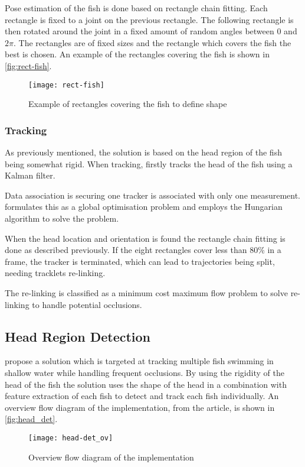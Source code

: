 Pose estimation of the fish is done based on rectangle chain fitting. Each rectangle is fixed to a joint on the previous rectangle. The following rectangle is then rotated around the joint in a fixed amount of random angles between $0$ and $2\pi$. The rectangles are of fixed sizes and the rectangle which covers the fish the best is chosen. An example of the rectangles covering the fish is shown in \autoref{fig:rect-fish}.

\begin{figure}[h]
  \centering
  \texttt{[image: rect-fish]}
  \caption{Example of rectangles covering the fish to define shape \citep{HongWang2016}}
  \label{fig:rect-fish}
\end{figure}

\subsubsection{Tracking}
As previously mentioned, the solution is based on the head region of the fish being somewhat rigid. When tracking, \cite{HongWang2016} firstly tracks the head of the fish using a Kalman filter. 

Data association is securing one tracker is associated with only one measurement. \cite{HongWang2016} formulates this as a global optimisation problem and employs the Hungarian algorithm to solve the problem.

When the head location and orientation is found the rectangle chain fitting is done as described previously. If the eight rectangles cover less than $80\%$ in a frame, the tracker is terminated, which can lead to trajectories being split, needing tracklets re-linking.

The re-linking is classified as a minimum cost maximum flow problem to solve re-linking to handle potential occlusions.

\subsection{Head Region Detection}
\cite{Qian2014} propose a solution which is targeted at tracking multiple fish swimming in shallow water while handling frequent occlusions. By using the rigidity of the head of the fish the solution uses the shape of the head in a combination with feature extraction of each fish to detect and track each fish individually. An overview flow diagram of the implementation, from the article, is shown in \autoref{fig:head_det}.

\begin{figure}[H]
	\centering
	\texttt{[image: head-det\_ov]}
	\caption{Overview flow diagram of the implementation \citep{Qian2014}}
	\label{fig:head_det}
\end{figure}

